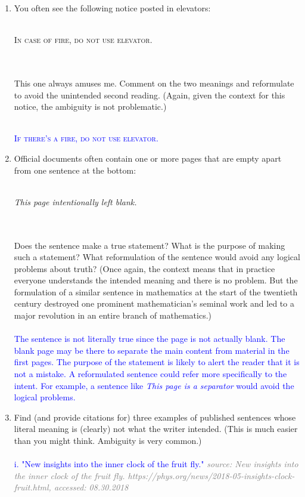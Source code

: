\documentclass[13.5pt]{article}
\begin{document}
\begin{enumerate}
\item{You often see the following notice posted in elevators:}\\\\ \centerline{\textsc{In case of fire, do not use elevator.}}\\\\
{This one always amuses me. Comment on the two meanings and reformulate to avoid the unintended
second reading. (Again, given the context for this notice, the ambiguity is not problematic.)}\\\\
\textcolor{blue}{\centerline{\textsc{If there's a fire, do not use elevator.}}}

\item{Official documents often contain one or more pages that are empty apart from one sentence at the bottom:}\\\\
\centerline{\textit{This page intentionally left blank.}}\\\\
{Does the sentence make a true statement? What is the purpose of making such a statement?
What reformulation of the sentence would avoid any logical problems about truth? (Once again,
the context means that in practice everyone understands the intended meaning and there is no
problem. But the formulation of a similar sentence in mathematics at the start of the twentieth
century destroyed one prominent mathematician's seminal work and led to a major revolution in
an entire branch of mathematics.)
}\\\\
\textcolor{blue}{The sentence is not literally true since the page is not actually blank. The blank page may be there to separate the main content from material in the first pages. The purpose of the statement is likely to alert the reader that it is not a mistake. A reformulated sentence could refer more specifically to the intent. For example, a sentence like \textit{This page is a separator} would avoid the logical problems.}
\item{Find (and provide citations for) three examples of published sentences whose literal meaning is (clearly) not what the writer intended. (This is much easier than you might think. Ambiguity is
very common.)}\\\\
\textcolor{blue}{i. "New insights into the inner clock of the fruit fly."}
\textcolor{gray}{\textit{source: New insights into the inner clock of the fruit fly. https://phys.org/news/2018-05-insights-clock-fruit.html, accessed: 08.30.2018}}\\\\

\end{enumerate}
\end{document}
